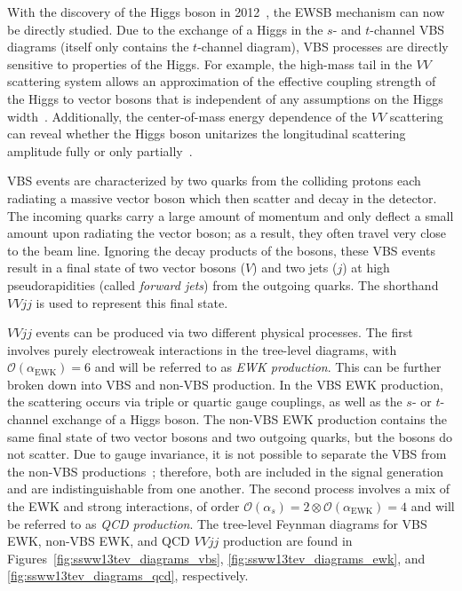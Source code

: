 With the discovery of the Higgs boson in 2012~\cite{HIGG-2012-27, CMS-HIG-12-028}, the EWSB mechanism can now be directly studied.
Due to the exchange of a Higgs in the $s$- and $t$-channel VBS diagrams (\ssww itself only contains the $t$-channel diagram), VBS processes are directly sensitive to properties of the Higgs.
For example, the high-mass tail in the $VV$ scattering system allows an approximation of the effective coupling strength of the Higgs to vector bosons that is independent of any assumptions on the Higgs width~\cite{2015.higgs-constraints-from-vbs}.
Additionally, the center-of-mass energy dependence of the $VV$ scattering can reveal whether the Higgs boson unitarizes the longitudinal scattering amplitude fully or only partially~\cite{2014.higgs-WW-scattering-theory}.

VBS events are characterized by two quarks from the colliding protons each radiating a massive vector boson which then scatter and decay in the detector.
The incoming quarks carry a large amount of momentum and only deflect a small amount upon radiating the vector boson; as a result, they often travel very close to the beam line.
Ignoring the decay products of the bosons, these VBS events result in a final state of two vector bosons ($V$) and two jets ($j$) at high pseudorapidities (called \emph{forward jets}) from the outgoing quarks.
The shorthand $VVjj$ is used to represent this final state.

$VVjj$ events can be produced via two different physical processes.
The first involves purely electroweak interactions in the tree-level diagrams, with $\mathcal{O}(\alpha_{\textrm{EWK}}) = 6$ %
and will be referred to as \emph{EWK production}.
This can be further broken down into VBS and non-VBS production.
In the VBS EWK production, the scattering occurs via triple or quartic gauge couplings, as well as the $s$- or $t$-channel exchange of a Higgs boson.
The non-VBS EWK production contains the same final state of two vector bosons and two outgoing quarks, but the bosons do not scatter.
Due to gauge invariance, it is not possible to separate the VBS from the non-VBS productions~\cite{2006.isolating-vbs-lhc}; therefore, both are included in the signal generation and are indistinguishable from one another.
The second process involves a mix of the EWK and strong interactions, of order $\mathcal{O}(\alpha_s) = 2 \otimes \mathcal{O}(\alpha_{\textrm{EWK}}) = 4$ and will be referred to as \emph{QCD production}.
The tree-level Feynman diagrams for VBS EWK, non-VBS EWK, and QCD $VVjj$ production are found in Figures~\ref{fig:ssww13tev_diagrams_vbs}, \ref{fig:ssww13tev_diagrams_ewk}, and \ref{fig:ssww13tev_diagrams_qcd}, respectively.

